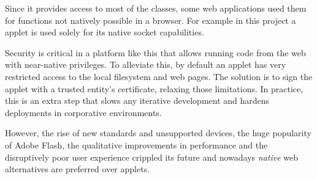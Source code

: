 Since it provides access to most of the  classes, some web applications used them for functions not natively possible in a browser.
For example in this project a  applet is used solely for its native socket capabilities.

Security is critical in a platform like this that allows running code from the web with near-native privileges.
To alleviate this, by default an applet has very restricted access to the local filesystem and web pages.
The solution is to sign the applet with a trusted entity's certificate, relaxing those limitations.
In practice, this is an extra step that slows any iterative development and hardens deployments in corporative environments.

However, the rise of new standards and unsupported devices, the huge popularity of Adobe Flash, the qualitative improvements in  performance and the disruptively poor user experience crippled its future and nowadays \emph{native} web alternatives are preferred over  applets.


